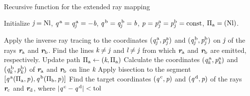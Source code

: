 \begin{algorithm}
\caption{Recursive function for the extended ray mapping}\label{alg:recursiveraymapping}
Initialize $\textit{j} = \textrm{Nl}$, $\textit{q}^{\,\textrm{a}}= \textit{q}^{\,\textrm{a}}_{\textit{j}}=-\textit{b}$, $\textit{q}^{\,\textrm{b}}= \textit{q}^{\,\textrm{b}}_{\textit{j}}=\textit{b}$, $\textit{p}_{\textrm{} \textit{}}=\textit{p}^{\textrm{a}}_{\textit{j}}=\textit{p}^{\textrm{b}}_{\textit{j}}=\textrm{const}$, $\Pi_{\textrm{a}}=({\textrm{Nl}})$.
\begin{algorithmic}[1]
\State Apply the inverse ray tracing to the coordinates $(\textit{q}^{\,\textrm{a}}_{\textit{j}},\textit{p}^{\textrm{a}}_{\textit{j}})$ and $(\textit{q}^{\,\textrm{b}}_{\textit{j}},\textit{p}^{\textrm{b}}_{\textit{j}})$ on $\textit{j}$ of the rays $\textit{\textbf{r}}_{\textrm{a}}$ and $\textit{\textbf{r}}_{\textrm{b}}$.
\State Find the lines $\textit{k}\neq\textit{j}$ and $\textit{l}\neq\textit{j}$ from which $\textit{\textbf{r}}_{\textrm{a}}$ and $\textit{\textbf{r}}_{\textrm{b}}$ are emitted, respectively.
\State Update path $\Pi_{\textrm{a}}\gets(\textit{k}, \Pi_{\textrm{a}})$
\State Calculate the coordinates $(\textit{q}^{\,\textrm{a}}_{\textit{k}},\textit{p}^{\textrm{a}}_{\textit{k}})$ and $(\textit{q}^{\,\textrm{b}}_{\textit{k}}, \textit{p}^{\textrm{b}}_{\textit{k}})$ of $\textit{\textbf{r}}_{\textrm{a}}$ and $\textit{\textbf{r}}_{\textrm{b}}$ on line $\textit{k}$
\If {$\lineaj = \lineak$}
\State{}
\EndIf
\Else 
\State Apply bisection to the segment $[\textit{q}^{\,\textrm{a}}(\Pi_\textrm{a}, \textit{p}_{\textrm{} \textit{}}), \textit{q}^{\,\textrm{b}}(\Pi_\textrm{b}, \textit{p}_{\textrm{} \textit{}})]$
\State Find the target coordinates $(\textit{q}^{\,\textrm{c}},\textit{p})$ and $(\textit{q}^{\,\textrm{d}},\textit{p})$ of the rays $\textit{\textbf{r}}_{\textrm{c}}$ and $\textit{\textbf{r}}_{\textrm{d}}$, where $|\textit{q}^{\,\textrm{c}}-\textit{q}^{\,\textrm{d}}|<\textrm{tol}$

\end{algorithmic}
\end{algorithm}
